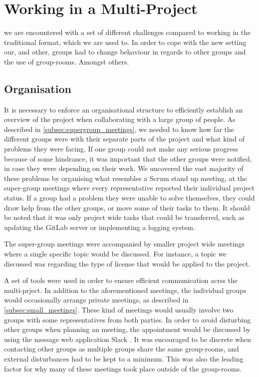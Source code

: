 \section{Working in a Multi-Project}
we are encountered with a set of different challenges compared to working in the traditional format, which we are used to. In order to cope with the new setting our, and other, groups had to change behaviour in regards to other groups and the use of group-rooms. Amongst others.

\subsection*{Organisation}
It is necessary to enforce an organisational structure to efficiently establish an overview of the project when collaborating with a large group of people. As described in \cref{subsec:supergroup_meetings}, we needed to know how far the different groups were with their separate parts of the project and what kind of problems they were facing. If one group could not make any serious progress because of some hindrance, it was important that the other groups were notified, in case they were depending on their work. We uncovered the vast majority of these problems by organising what resembles a Scrum stand up meeting, at the super-group meetings where every representative reported their individual project status. If a group had a problem they were unable to solve themselves, they could draw help from the other groups, or move some of their tasks to them. It should be noted that it was only project wide tasks that could be transferred, such as updating the GitLab server or implementing a logging system.

The super-group meetings were accompanied by smaller project wide meetings where a single specific topic would be discussed. For instance, a topic we discussed was regarding the type of license that would be applied to the project.

A set of tools were used in order to ensure efficient communication acrss the multi-prject. In addition to the aforementioned meetings, the individual groups would occasionally arrange private meetings, as described in \cref{subsec:small_meetings}. These kind of meetings would usually involve two groups with some representatives from both parties. In order to avoid disturbing other groups when planning an meeting, the appointment would be discussed by using the message web application Slack \cite{slack}. It was encouraged to be discrete when contacting other groups as multiple groups share the same group-rooms, and external disturbances had to be kept to a minimum. This was also the leading factor for why many of these meetings took place outside of the group-rooms.

